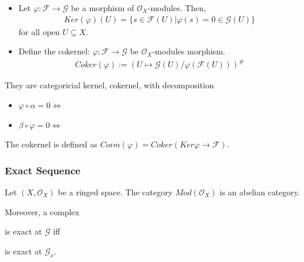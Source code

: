 \documentclass[Total.tex]{subfiles}
\begin{document}
		\begin{Def}
			\begin{itemize}
				\item Let $\varphi:\mathcal{F}\rightarrow \mathcal{G}$ be a morphism of $\mathcal{O}_X$-modules. Then,
				\begin{gather*}
					Ker(\varphi)(U)=\{s\in \mathcal{F}(U)|\varphi(s)=0\in \mathcal{G}(U)\}
				\end{gather*}
				for all open $U\subseteq X$.
				\item Define the cokernel: $\varphi:\mathcal{F}\rightarrow \mathcal{G}$ be $\mathcal{O}_X$-modules morphism.
				\begin{gather*}
					Coker(\varphi):=(U\mapsto \mathcal{G}(U)/\varphi(\mathcal{F}(U)))^\#
				\end{gather*}
			\end{itemize}
		\end{Def}
		They are categoricial kernel, cokernel, with decomposition
		\begin{itemize}
			\item $\varphi\circ\alpha=0\Leftrightarrow$ 
			\item $\beta\circ \varphi=0\Leftrightarrow$ 
		\end{itemize}
		
		The cokernel is defined as $Coim(\varphi)=Coker(Ker\varphi\rightarrow \mathcal{F})$.
		
		\subsubsection{Exact Sequence}
		
			\begin{lemma}
				Let $(X,\mathcal{O}_X)$ be a ringed space. The category $Mod(\mathcal{O}_X)$ is an abelian category.
				
				Moreover, a complex
				\begin{center}
				\end{center}
				
				is exact at $\mathcal{G}$ iff
				\begin{center}
				\end{center}
				
				is exact at $\mathcal{G}_x$.
			\end{lemma}
			
\end{document}
